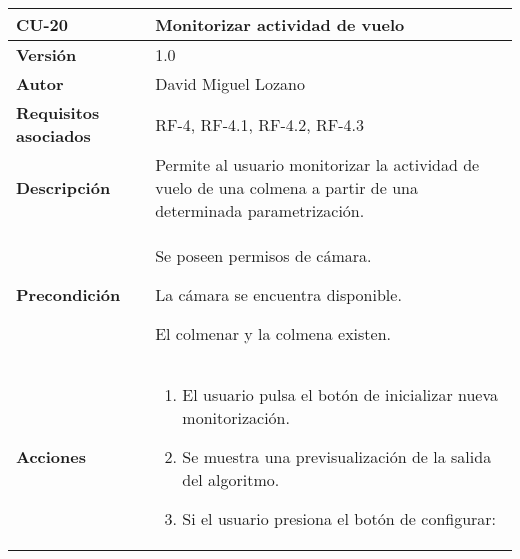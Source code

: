 \begin{longtable}[H]{@{}ll@{}}
\toprule
\begin{minipage}[b]{0.269\columnwidth}\raggedright\strut
\textbf{CU-20}\strut
\end{minipage} & \begin{minipage}[b]{0.75\columnwidth}\raggedright\strut
\textbf{Monitorizar actividad de vuelo}\strut
\end{minipage}\tabularnewline
\midrule
\endhead
\begin{minipage}[t]{0.269\columnwidth}\raggedright\strut
\textbf{Versión}\strut
\end{minipage} & \begin{minipage}[t]{0.75\columnwidth}\raggedright\strut
1.0\strut
\end{minipage}\tabularnewline
\begin{minipage}[t]{0.269\columnwidth}\raggedright\strut
\textbf{Autor}\strut
\end{minipage} & \begin{minipage}[t]{0.75\columnwidth}\raggedright\strut
David Miguel Lozano\strut
\end{minipage}\tabularnewline
\begin{minipage}[t]{0.269\columnwidth}\raggedright\strut
\textbf{Requisitos asociados}\strut
\end{minipage} & \begin{minipage}[t]{0.75\columnwidth}\raggedright\strut
RF-4, RF-4.1, RF-4.2, RF-4.3\strut
\end{minipage}\tabularnewline
\begin{minipage}[t]{0.269\columnwidth}\raggedright\strut
\textbf{Descripción}\strut
\end{minipage} & \begin{minipage}[t]{0.75\columnwidth}\raggedright\strut
Permite al usuario monitorizar la actividad de vuelo de una colmena a
partir de una determinada parametrización.\strut
\end{minipage}\tabularnewline
\begin{minipage}[t]{0.269\columnwidth}\raggedright\strut
\textbf{Precondición}\strut
\end{minipage} & \begin{minipage}[t]{0.75\columnwidth}\raggedright\strut
Se poseen permisos de cámara.

La cámara se encuentra disponible.

El colmenar y la colmena existen.\strut
\end{minipage}\tabularnewline
\begin{minipage}[t]{0.269\columnwidth}\raggedright\strut
\textbf{Acciones}\strut
\end{minipage} & \begin{minipage}[t]{0.75\columnwidth}\raggedright\strut
\begin{enumerate}
\def\labelenumi{\arabic{enumi}.}
\tightlist
\item
  El usuario pulsa el botón de inicializar nueva monitorización.
\item
  Se muestra una previsualización de la salida del algoritmo.
\item
  Si el usuario presiona el botón de configurar:


\end{enumerate}
\end{minipage}
\end{longtable}
